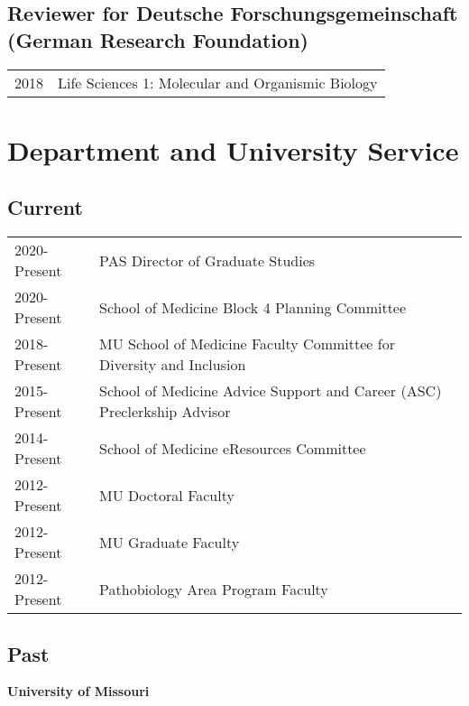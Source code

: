\documentclass[11pt, a4paper]{awesome-cv}
\begin{document}
\hypertarget{reviewer-for-deutsche-forschungsgemeinschaft-german-research-foundation}{%
\subsection{Reviewer for Deutsche Forschungsgemeinschaft (German
Research
Foundation)}\label{reviewer-for-deutsche-forschungsgemeinschaft-german-research-foundation}}

\begin{tabular}{ll}
  2018 & Life Sciences 1: Molecular and Organismic Biology \\ 
  \end{tabular}

\hypertarget{department-and-university-service}{%
\section{Department and University
Service}\label{department-and-university-service}}

\hypertarget{current-1}{%
\subsection{Current}\label{current-1}}

\begin{tabular}{ll}
  2020-Present & PAS Director of Graduate Studies \\ 
  2020-Present & School of Medicine Block 4 Planning Committee \\ 
  2018-Present & MU School of Medicine Faculty Committee for Diversity and Inclusion \\ 
  2015-Present & School of Medicine Advice Support and Career (ASC) Preclerkship Advisor \\ 
  2014-Present & School of Medicine eResources Committee \\ 
  2012-Present & MU Doctoral Faculty \\ 
  2012-Present & MU Graduate Faculty \\ 
  2012-Present & Pathobiology Area Program Faculty \\ 
  \end{tabular}

\hypertarget{past-1}{%
\subsection{Past}\label{past-1}}

\textbf{University of Missouri}
\end{document}
